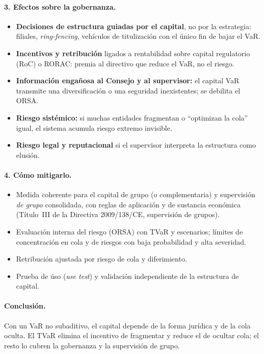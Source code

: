 \documentclass[a4paper,12pt]{article}
\begin{document}
\paragraph{3. Efectos sobre la gobernanza.}
\begin{itemize}[leftmargin=*,itemsep=1pt]
\item \textbf{Decisiones de estructura guiadas por el capital}, no por la estrategia: filiales, \emph{ring-fencing}, vehículos de titulización con el \'unico fin de bajar el VaR.
\item \textbf{Incentivos y retribuci\'on} ligados a rentabilidad sobre capital regulatorio (RoC) o RORAC: premia al directivo que reduce el VaR, no el riesgo.
\item \textbf{Informaci\'on enga\~nosa al Consejo y al supervisor:} el capital VaR transmite una diversificaci\'on o una seguridad inexistentes; se debilita el ORSA.
\item \textbf{Riesgo sistémico:} si muchas entidades fragmentan o ``optimizan la cola'' igual, el sistema acumula riesgo extremo invisible.
\item \textbf{Riesgo legal y reputacional} si el supervisor interpreta la estructura como elusi\'on.
\end{itemize}

\paragraph{4. C\'omo mitigarlo.}
\begin{itemize}[leftmargin=*,itemsep=1pt]
\item Medida coherente para el capital de grupo (o complementaria) y supervisi\'on \emph{de grupo} consolidada, con reglas de aplicaci\'on y de sustancia econ\'omica (T\'itulo~III de la Directiva 2009/138/CE, supervisi\'on de grupos).
\item Evaluaci\'on interna del riesgo (ORSA) con TVaR y escenarios; l\'imites de concentraci\'on en cola y de riesgos con baja probabilidad y alta severidad.
\item Retribuci\'on ajustada por riesgo de cola y diferimiento.
\item Prueba de \'uso (\emph{use test}) y validaci\'on independiente de la estructura de capital.
\end{itemize}

\paragraph{Conclusi\'on.} Con un VaR no subaditivo, el capital depende de la forma jur\'idica y de la cola oculta. El TVaR elimina el incentivo de fragmentar y reduce el de ocultar cola; el resto lo cubren la gobernanza y la supervisi\'on de grupo.
\end{document}
